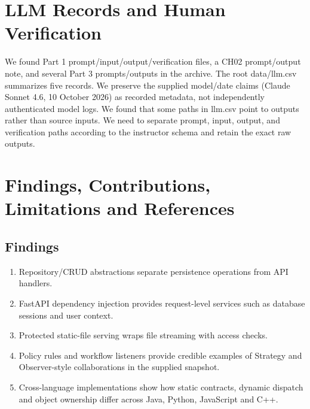 \documentclass[11pt,a4paper]{article}
\begin{document}
\section{LLM Records and Human Verification}
We found Part 1 prompt/input/output/verification files, a CH02 prompt/output note, and several Part 3 prompts/outputs in the archive. The root data/llm.csv summarizes five records. We preserve the supplied model/date claims (Claude Sonnet 4.6, 10 October 2026) as recorded metadata, not independently authenticated model logs. We found that some paths in llm.csv point to outputs rather than source inputs. We need to separate prompt, input, output, and verification paths according to the instructor schema and retain the exact raw outputs.

\section{Findings, Contributions, Limitations and References}
\subsection{Findings}
\begin{enumerate}[itemsep=2pt]
\item Repository/CRUD abstractions separate persistence operations from API handlers.
\item FastAPI dependency injection provides request-level services such as database sessions and user context.
\item Protected static-file serving wraps file streaming with access checks.
\item Policy rules and workflow listeners provide credible examples of Strategy and Observer-style collaborations in the supplied snapshot.
\item Cross-language implementations show how static contracts, dynamic dispatch and object ownership differ across Java, Python, JavaScript and C++.
\end{enumerate}
\end{document}
